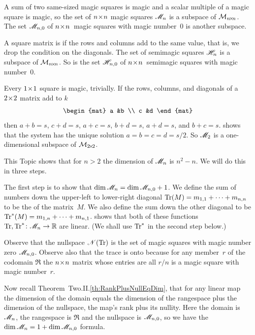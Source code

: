 A sum of two same-sized magic squares is magic and a 
scalar multiple of a magic square is magic, so the set of 
$n \! \times \! n$ magic squares
$\mathscr{M}_n$ is a subspace of $\mathcal{M}_{n \! \times \! n}$.
The set $\mathscr{M}_{n,0}$ of $n \! \times \! n$~magic squares with magic number~$0$ 
is another subspace.

A square matrix is  if 
the rows and columns add to the same value, that is, we drop the
condition on the diagonals.
The set of semimagic squares $\mathscr{H}_n$ 
is a subspace of $\mathcal{M}_{n \! \times \! n}$.
So is the set $\mathscr{H}_{n,0}$  
of $n \! \times \! n$~semimagic squares with magic number~$0$. 

Every $1 \! \times \! 1$ square is magic, trivially.
If the rows, columns, and diagonals of a $2 \! \times \! 2$ matrix add to $k$
\begin{equation*}
  \begin{mat}
    a  &b  \\
    c  &d
  \end{mat}
\end{equation*}
then $a+b=s$, $c+d=s$, $a+c=s$, $b+d=s$, $a+d=s$, and $b+c=s$.
 shows that
the system has the unique solution $a=b=c=d=s/2$.
So $\mathscr{M}_2$ is a one-dimensional subspace of $\mathcal{M}_{2 \! \times \! 2}$.

This Topic shows that for $n>2$ the 
dimension of
$\mathscr{M}_n$ is $n^2-n$.
We will do this in three steps.

The first step is to show that $\dim\mathscr{M}_n=\dim\mathscr{M}_{n,0}+1$.
We define 
the sum of numbers down the upper-left to lower-right diagonal
$\operatorname{Tr} (M)=m_{1,1}+\cdots+m_{n,n}$ to be the 
of the matrix~$M$.
We also define
the sum down the other diagonal to be
$\operatorname{Tr}^* (M)=m_{1,n}+\cdots+m_{n,1}$.
 shows that both of these functions 
$\mbox{$\operatorname{Tr},\operatorname{Tr}^*\colon \mathscr{M}_n\to \mathbb{R}$}$ 
are linear.
(We shall use $\operatorname{Tr}^*$ in the second step below.)

Observe that 
the nullspace $\mathscr{N}(\operatorname{Tr})$ is the set of magic squares with magic
number zero 
$\mathscr{M}_{n,0}$.
Observe also that the trace is onto because for any member~$r$ of the 
codomain $\Re$ the $n \! \times \! n$ matrix whose entries are all $r/n$ is
a magic square with magic number~$r$. 

Now recall 
Theorem~Two.II.\ref{th:RankPlusNullEqDim}, that for any linear map the
dimension of the domain equals the dimension of the rangespace 
plus the dimension of the nullspace,
the map's rank plus its nullity.
Here the domain is $\mathscr{M}_n$, the rangespace is 
$\Re$ and the nullspace is $\mathscr{M}_{n,0}$,
so we have the $\dim\mathscr{M}_n=1+\dim\mathscr{M}_{n,0}$
formula.

